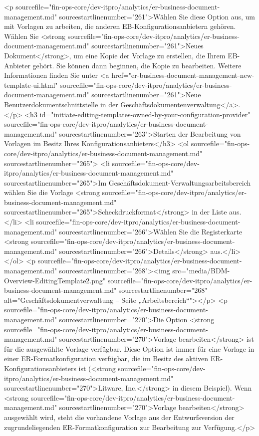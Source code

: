 <p sourcefile="fin-ops-core/dev-itpro/analytics/er-business-document-management.md" sourcestartlinenumber="261">Wählen Sie diese Option aus, um mit Vorlagen zu arbeiten, die anderen EB-Konfigurationsanbietern gehören. Wählen Sie <strong sourcefile="fin-ops-core/dev-itpro/analytics/er-business-document-management.md" sourcestartlinenumber="261">Neues Dokument</strong>, um eine Kopie der Vorlage zu erstellen, die Ihrem EB-Anbieter gehört. Sie können dann beginnen, die Kopie zu bearbeiten. Weitere Informationen finden Sie unter <a href="er-business-document-management-new-template-ui.html" sourcefile="fin-ops-core/dev-itpro/analytics/er-business-document-management.md" sourcestartlinenumber="261">Neue Benutzerdokumentschnittstelle in der Geschäftsdokumentenverwaltung</a>.</p>
<h3 id="initiate-editing-templates-owned-by-your-configuration-provider" sourcefile="fin-ops-core/dev-itpro/analytics/er-business-document-management.md" sourcestartlinenumber="263">Starten der Bearbeitung von Vorlagen im Besitz Ihres Konfigurationsanbieters</h3>
<ol sourcefile="fin-ops-core/dev-itpro/analytics/er-business-document-management.md" sourcestartlinenumber="265">
<li sourcefile="fin-ops-core/dev-itpro/analytics/er-business-document-management.md" sourcestartlinenumber="265">Im Geschäftsdokument-Verwaltungsarbeitsbereich wählen Sie die Vorlage <strong sourcefile="fin-ops-core/dev-itpro/analytics/er-business-document-management.md" sourcestartlinenumber="265">Scheckdruckformat</strong> in der Liste aus.</li>
<li sourcefile="fin-ops-core/dev-itpro/analytics/er-business-document-management.md" sourcestartlinenumber="266">Wählen Sie die Registerkarte <strong sourcefile="fin-ops-core/dev-itpro/analytics/er-business-document-management.md" sourcestartlinenumber="266">Details</strong> aus.</li>
</ol>
<p sourcefile="fin-ops-core/dev-itpro/analytics/er-business-document-management.md" sourcestartlinenumber="268"><img src="media/BDM-Overview-EditingTemplate2.png" sourcefile="fin-ops-core/dev-itpro/analytics/er-business-document-management.md" sourcestartlinenumber="268" alt="Geschäftsdokumentverwaltung – Seite „Arbeitsbereich“"></p>
<p sourcefile="fin-ops-core/dev-itpro/analytics/er-business-document-management.md" sourcestartlinenumber="270">Die Option <strong sourcefile="fin-ops-core/dev-itpro/analytics/er-business-document-management.md" sourcestartlinenumber="270">Vorlage bearbeiten</strong> ist für die ausgewählte Vorlage verfügbar. Diese Option ist immer für eine Vorlage in einer ER-Formatkonfiguration verfügbar, die im Besitz des aktiven ER-Konfigurationsanbieters ist (<strong sourcefile="fin-ops-core/dev-itpro/analytics/er-business-document-management.md" sourcestartlinenumber="270">Litware, Inc.</strong> in diesem Beispiel). Wenn <strong sourcefile="fin-ops-core/dev-itpro/analytics/er-business-document-management.md" sourcestartlinenumber="270">Vorlage bearbeiten</strong> ausgewählt wird, steht die vorhandene Vorlage aus der Entwurfsversion der zugrundeliegenden ER-Formatkonfiguration zur Bearbeitung zur Verfügung.</p>

